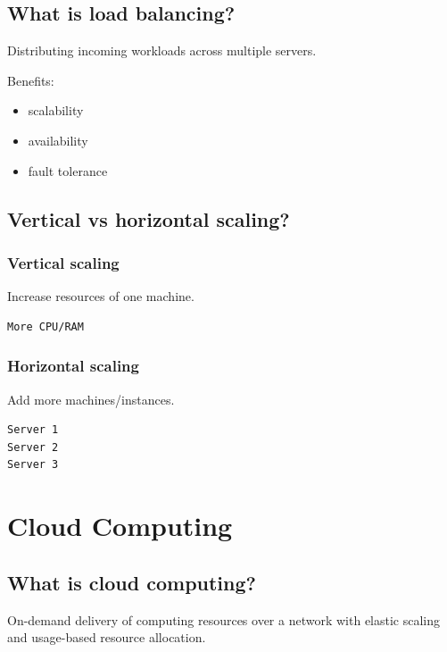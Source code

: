 \medskip

\subsection{What is load balancing?}

Distributing incoming workloads across multiple servers.

Benefits:

\begin{itemize}
  \item scalability
  \item availability
  \item fault tolerance
\end{itemize}

\medskip

\subsection{Vertical vs horizontal scaling?}

\subsubsection{Vertical scaling}

Increase resources of one machine.

\begin{lstlisting}
More CPU/RAM
\end{lstlisting}

\subsubsection{Horizontal scaling}

Add more machines/instances.

\begin{lstlisting}
Server 1
Server 2
Server 3
\end{lstlisting}

\medskip

\section{Cloud Computing}

\subsection{What is cloud computing?}

On-demand delivery of computing resources over a network with elastic scaling and usage-based resource allocation.

